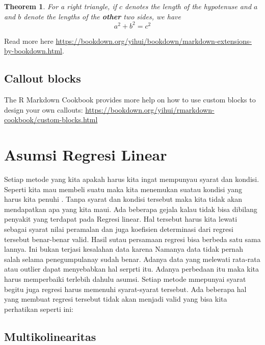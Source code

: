 \documentclass[
]{book}
\newtheorem{theorem}{Theorem}[chapter]
\theoremstyle{definition}
\theoremstyle{definition}
\theoremstyle{definition}
\theoremstyle{definition}
\theoremstyle{remark}
\begin{document}
\begin{theorem}
\protect\hypertarget{thm:tri}{}\label{thm:tri}For a right triangle, if \(c\) denotes the \emph{length} of the hypotenuse
and \(a\) and \(b\) denote the lengths of the \textbf{other} two sides, we have
\[a^2 + b^2 = c^2\]
\end{theorem}

Read more here \url{https://bookdown.org/yihui/bookdown/markdown-extensions-by-bookdown.html}.

\hypertarget{callout-blocks}{%
\section{Callout blocks}\label{callout-blocks}}

The R Markdown Cookbook provides more help on how to use custom blocks to design your own callouts: \url{https://bookdown.org/yihui/rmarkdown-cookbook/custom-blocks.html}

\hypertarget{asumsi-regresi-linear}{%
\chapter{Asumsi Regresi Linear}\label{asumsi-regresi-linear}}

Setiap metode yang kita apakah harus kita ingat mempunyau syarat dan kondisi. Seperti kita mau membeli suatu maka kita menemukan suatau kondisi yang harus kita penuhi . Tanpa syarat dan kondisi tersebut maka kita tidak akan mendapatkan apa yang kita maui. Ada beberapa gejala kalau tidak bisa dibilang penyakit yang terdapat pada Regresi linear. Hal tersebut harus kita lewati sebagai syarat nilai peramalan dan juga koefisien determinasi dari regresi tersebut benar-benar valid.
Hasil sutau persamaan regresi bisa berbeda satu sama lannya. Ini bukan terjasi kesalahan data karena Namanya data tidak pernah salah selama penegumpulanay sudah benar. Adanya data yang melewati rata-rata atau outlier dapat menyebabkan hal serprti itu. Adanya perbedaan itu maka kita harus memperbaiki terlebih dahulu asumsi. Setiap metode mmepunyai syarat begitu juga regresi harus memenuhi syarat-syarat tersebut.
Ada beberapa hal yang membuat regresi tersebut tidak akan menjadi valid yang bisa kita perhatikan seperti ini:

\hypertarget{multikolinearitas}{%
\section{Multikolinearitas}\label{multikolinearitas}}
\end{document}
